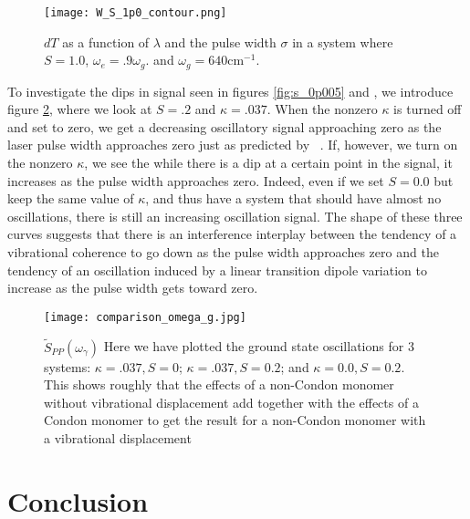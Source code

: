 \begin{figure}
   \texttt{[image: W\_S\_1p0\_contour.png]}
   \caption{$dT$ as a function of $\lambda$ and the pulse width $\sigma$ in a system where $S=1.0$, $\omega_e = .9 \omega_g$. and $\omega_g = 640 \text{cm}^{-1}$. }
	\label{fig:s_1p0}
\end{figure}

To investigate the dips in signal seen in figures \ref{fig:s_0p005} and \label{fig:s_0p2}, we introduce figure \ref{fig:addedSignals}, where we look at $S=.2$ and $\kappa=.037$.   When the nonzero $\kappa$ is turned off and set to zero, we get a decreasing oscillatory signal approaching zero as the laser pulse width approaches zero just as predicted by ~\cite{allanWitness}.  If, however, we turn on the nonzero $\kappa$, we see the while there is a dip at a certain point in the signal, it increases as the pulse width approaches zero.  Indeed, even if we set $S=0.0$ but keep the same value of $\kappa$, and thus have a system that should have almost no oscillations, there is still an increasing oscillation signal.  The shape of these three curves suggests that there is an interference interplay between the tendency of a vibrational coherence to go down as the pulse width approaches zero and the tendency of an oscillation induced by a linear transition dipole variation to increase as the pulse width gets toward zero.

\begin{figure}
   \texttt{[image: comparison\_omega\_g.jpg]}
   \caption{$\tilde{S}_{PP} ( \omega_{\gamma})$ Here we have plotted the ground state oscillations for 3 systems: $\kappa=.037, S=0$; $\kappa=.037, S=0.2$; and $\kappa=0.0, S=0.2$.  This shows roughly that the effects of a non-Condon monomer without vibrational displacement add together with the effects of a Condon monomer to get the result for a non-Condon monomer with a vibrational displacement}
	\label{fig:addedSignals}
\end{figure}




\section{Conclusion}

